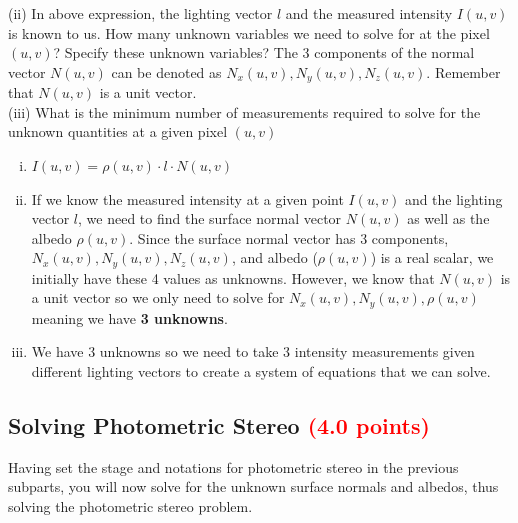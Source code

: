 \documentclass[answers]{exam}
\newcommand{\mypoints}[1]{\textcolor{red}{(#1 points)}}
\begin{document}
(ii) In above expression, the lighting vector $l$ and the measured intensity $I(u,v)$ is known to us. How many unknown variables we need to solve for at the pixel $(u,v)$? Specify these unknown variables? The 3 components of the normal vector $N(u,v)$ can be denoted as $N_{x}(u,v), N_{y}(u,v), N_{z}(u,v)$. Remember that $N(u,v)$ is a unit vector.  \\

(iii) What is the minimum number of measurements required to solve for the unknown quantities at a given pixel $(u,v)$


\begin{solution}
\begin{enumerate}[i)]
    \item $I(u,v)=\rho(u,v)\cdot l\cdot N(u,v)$
    \item If we know the measured intensity at a given point $I(u,v)$ and the lighting vector $l$, we need to find the surface normal vector $N(u,v)$ as well as the albedo $\rho(u,v)$. Since the surface normal vector has 3 components, $N_{x}(u,v), N_{y}(u,v), N_{z}(u,v)$, and albedo ($\rho(u,v)$) is a real scalar, we initially have these 4 values as unknowns. However, we know that $N(u,v)$ is a unit vector so we only need to solve for $N_{x}(u,v), N_{y}(u,v), \rho(u,v)$ meaning we have \textbf{3 unknowns}.
    \item We have 3 unknowns so we need to take 3 intensity measurements given different lighting vectors to create a system of equations that we can solve.
    \end{enumerate}
\end{solution}

\subsection{Solving Photometric Stereo \mypoints{4.0}} \label{sec:Linearity} 
Having set the stage and notations for photometric stereo in the previous subparts, you will now solve for the unknown surface normals and albedos, thus solving the photometric stereo problem. \\  
\end{document}
